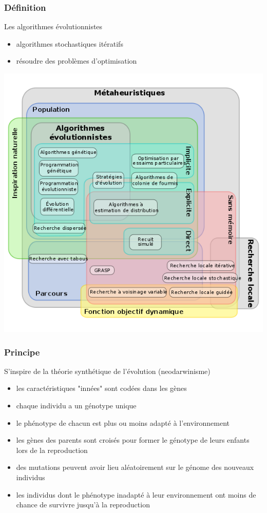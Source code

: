\documentclass{beamer}
\begin{document}
\begin{frame}
\frametitle{Définition}
Les algorithmes évolutionnistes
\begin{itemize}
	\item algorithmes stochastiques itératifs
	\item résoudre des problèmes d'optimisation
\end{itemize}
\begin{center}
        \includegraphics[width=.60\linewidth]{images/metaheuristiques}
\end{center}
\end{frame}


\begin{frame}
\frametitle{Principe}
S'inspire de la théorie synthétique de l'évolution (neodarwinisme)
\begin{itemize}
	\item les caractéristiques "innées" sont codées dans les gènes
	\item chaque individu a un génotype unique
	\item le phénotype de chacun est plus ou moins adapté à l'environnement
	\item les gènes des parents sont croisés pour former le génotype de leurs enfants lors de la reproduction
	\item des mutations peuvent avoir lieu aléatoirement sur le génome des nouveaux individus
	\item les individus dont le phénotype inadapté à leur environnement ont moins de chance de survivre jusqu'à la reproduction
\end{itemize}
\end{frame}
\end{document}
